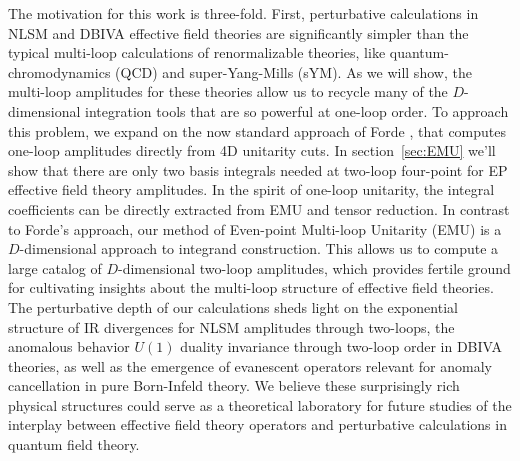 \documentclass[12pt,letter]{article}
\def\sect#1{section~\ref{#1}}
\begin{document}
The motivation for this work is three-fold. First, perturbative calculations in NLSM and DBIVA effective field theories are significantly simpler than the typical multi-loop calculations of renormalizable theories, like quantum-chromodynamics (QCD) and super-Yang-Mills (sYM). As we will show, the multi-loop amplitudes for these theories allow us to recycle many of the $D$-dimensional integration tools that are so powerful at one-loop order. To approach this problem, we expand on the now standard approach of Forde \cite{Forde:2007mi}, that computes one-loop amplitudes directly from 4D unitarity cuts. In \sect{sec:EMU} we'll show that there are only two basis integrals needed at two-loop four-point for EP effective field theory amplitudes. In the spirit of one-loop unitarity, the integral coefficients can be directly extracted from EMU and tensor reduction. In contrast to Forde's approach, our method of Even-point Multi-loop Unitarity (EMU) is a $D$-dimensional approach to integrand construction. This allows us to compute a large catalog of $D$-dimensional two-loop amplitudes, which provides fertile ground for cultivating insights about the multi-loop structure of effective field theories. The perturbative depth of our calculations sheds light on the exponential structure of IR divergences for NLSM amplitudes through two-loops, the anomalous behavior $U(1)$ duality invariance through two-loop order in DBIVA theories, as well as the emergence of evanescent operators relevant for anomaly cancellation in pure Born-Infeld theory. We believe these surprisingly rich physical structures could serve as a theoretical laboratory for future studies of the interplay between effective field theory operators and perturbative calculations in quantum field theory. 
\end{document}
